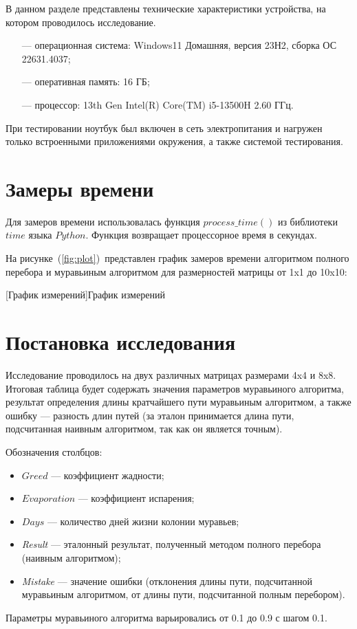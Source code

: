 \documentclass{bmstu}
\begin{document}
В данном разделе представлены технические характеристики устройства, на котором проводилось исследование.

\begin{itemize}
    \item[---] операционная система: Windows11 Домашняя, версия 23Н2, сборка ОС 22631.4037;
    \item[---] оперативная память: 16 ГБ;
    \item[---] процессор: 13th Gen Intel(R) Core(TM) i5-13500H   2.60 ГГц.
\end{itemize}

При тестировании ноутбук был включен в сеть электропитания и нагружен только встроенными приложениями окружения, а также системой тестирования.

\section{Замеры времени}
Для замеров времени использовалась функция $process\_time()$ из библиотеки $time$ языка $Python$. Функция возвращает процессорное время в секундах.

На рисунке~(\ref{fig:plot})~представлен график замеров времени алгоритмом полного перебора и муравьиным алгоритмом для размерностей матрицы от 1x1 до 10x10:
\newpage
{
 \centering
 
 [График измерений]{График измерений}
 \label{fig:plot}
}
\newpage
\section{Постановка исследования}
Исследование проводилось на двух различных матрицах размерами 4x4 и 8x8. Итоговая таблица будет содержать значения параметров муравьиного алгоритма, результат определения длины кратчайшего пути муравьиным алгоритмом, а также ошибку --- разность длин путей (за эталон принимается длина пути, подсчитанная наивным алгоритмом, так как он является точным).
\par Обозначения столбцов:
\begin{itemize}[label=---]
	\item $Greed$ --- коэффициент жадности;
	\item $Evaporation$ --- коэффициент испарения;
	\item $Days$ --- количество дней жизни колонии муравьев;
	\item \textit{Result} --- эталонный результат, полученный методом полного перебора (наивным алгоритмом);
	\item \textit{Mistake} --- значение ошибки (отклонения длины пути, подсчитанной муравьиным алгоритмом, от длины пути, подсчитанной полным перебором).
\end{itemize}
Параметры муравьиного алгоритма варьировались  от 0.1 до 0.9 с шагом 0.1.
\end{document}
